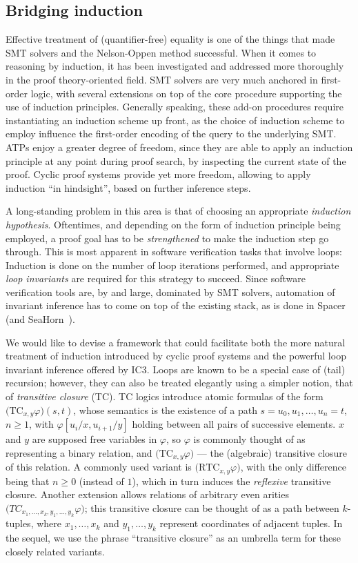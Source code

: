 \subsection{Bridging induction}

Effective treatment of (quantifier-free) equality is one of the things that made SMT solvers and the Nelson-Oppen method successful.
When it comes to reasoning by induction, it has been investigated and addressed more thoroughly in the proof theory-oriented field.
SMT solvers are very much anchored in first-order logic, with several extensions on top of the core procedure supporting the use of induction principles.
Generally speaking, these add-on procedures require instantiating an induction scheme up front, as the choice of induction scheme to employ influence the first-order encoding of the query to the underlying SMT.
ATPs enjoy a greater degree of freedom, since they are able to apply an induction principle at any point during proof search, by inspecting the current state of the proof.
Cyclic proof systems provide yet more freedom, allowing to apply induction ``in hindsight'', based on further inference steps.

A long-standing problem in this area is that of choosing an appropriate \emph{induction hypothesis}.
Oftentimes, and depending on the form of induction principle being employed, a proof goal has to be \emph{strengthened} to make the induction step go through.
This is most apparent in software verification tasks that involve loops:
Induction is done on the number of loop iterations performed, and appropriate \emph{loop invariants} are required for this strategy to succeed.
Since software verification tools are, by and large, dominated by SMT solvers, automation of invariant inference has to come on top of the existing stack, as is done in Spacer~\cite{spacer} (and SeaHorn~\cite{seahorn}).

We would like to devise a framework that could facilitate both the more natural treatment of induction introduced by cyclic proof systems and the powerful loop invariant inference offered by IC3.
Loops are known to be a special case of (tail) recursion; however, they can also be treated elegantly using a simpler notion, that of \emph{transitive closure} (TC).
TC logics introduce atomic formulas of the form $\big(\mathrm{TC}_{x,y}\varphi\big)(s,t)$,
whose semantics is the existence of a path $s=u_0,u_1,\ldots,u_n=t$, $n\geq 1$, with $\varphi[u_i/x,u_{i+1}/y]$
holding between all pairs of successive elements.
$x$ and $y$ are supposed free variables in $\varphi$, so $\varphi$ is commonly thought of as representing a binary relation, and $\big(\mathrm{TC}_{x,y}\varphi\big)$ --- the (algebraic) transitive closure of this relation.
A commonly used variant is $\big(\mathrm{RTC}_{x,y}\varphi\big)$, with the only difference being that $n\geq 0$ (instead of $1$),
which in turn induces the \emph{reflexive} transitive closure.
Another extension allows relations of arbitrary even arities
$\big(TC_{x_1,\ldots,x_k,y_1,\ldots,y_k}\varphi\big)$;
this transitive closure can be thought of as a path between $k$-tuples, where $x_1,\ldots,x_k$ and $y_1,\ldots,y_k$ represent coordinates of adjacent tuples.
In the sequel, we use the phrase ``transitive closure'' as an umbrella term for these closely related variants.

